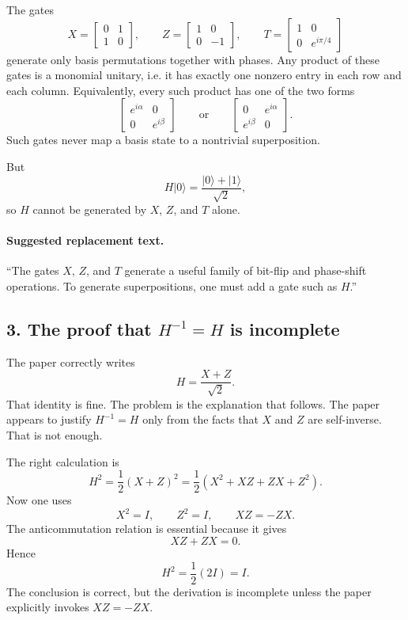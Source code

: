 \documentclass[11pt]{article}
\begin{document}
The gates
\[
X=\begin{bmatrix}0&1\\1&0\end{bmatrix}, \qquad
Z=\begin{bmatrix}1&0\\0&-1\end{bmatrix}, \qquad
T=\begin{bmatrix}1&0\\0&e^{i\pi/4}\end{bmatrix}
\]
generate only basis permutations together with phases. Any product of these gates is a monomial unitary, i.e. it has exactly one nonzero entry in each row and each column. Equivalently, every such product has one of the two forms
\[
\begin{bmatrix}
e^{i\alpha} & 0\\
0 & e^{i\beta}
\end{bmatrix}
\qquad \text{or} \qquad
\begin{bmatrix}
0 & e^{i\alpha}\\
e^{i\beta} & 0
\end{bmatrix}.
\]
Such gates never map a basis state to a nontrivial superposition.

But
\[
H|0\rangle=\frac{|0\rangle+|1\rangle}{\sqrt2},
\]
so \(H\) cannot be generated by \(X\), \(Z\), and \(T\) alone.

\paragraph{Suggested replacement text.}
``The gates \(X\), \(Z\), and \(T\) generate a useful family of bit-flip and phase-shift operations. To generate superpositions, one must add a gate such as \(H\).''

\subsection*{3. The proof that \(H^{-1}=H\) is incomplete}

The paper correctly writes
\[
H=\frac{X+Z}{\sqrt2}.
\]
That identity is fine. The problem is the explanation that follows. The paper appears to justify \(H^{-1}=H\) only from the facts that \(X\) and \(Z\) are self-inverse. That is not enough.

The right calculation is
\[
H^2=\frac12(X+Z)^2
=\frac12\left(X^2+XZ+ZX+Z^2\right).
\]
Now one uses
\[
X^2=I, \qquad Z^2=I, \qquad XZ=-ZX.
\]
The anticommutation relation is essential because it gives
\[
XZ+ZX=0.
\]
Hence
\[
H^2=\frac12(2I)=I.
\]
The conclusion is correct, but the derivation is incomplete unless the paper explicitly invokes \(XZ=-ZX\).
\end{document}
